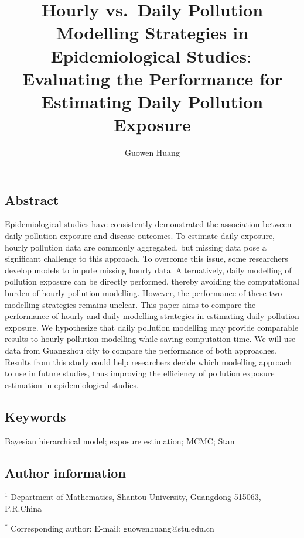 \documentclass[
  12,
]{article}
\title{Hourly vs.~Daily Pollution Modelling Strategies in
Epidemiological Studies\(:\) Evaluating the Performance for Estimating
Daily Pollution Exposure}
\author{Guowen Huang}
\begin{document}
\maketitle

\hypertarget{abstract}{%
\subsection*{Abstract}\label{abstract}}

Epidemiological studies have consistently demonstrated the association
between daily pollution exposure and disease outcomes. To estimate daily
exposure, hourly pollution data are commonly aggregated, but missing
data pose a significant challenge to this approach. To overcome this
issue, some researchers develop models to impute missing hourly data.
Alternatively, daily modelling of pollution exposure can be directly
performed, thereby avoiding the computational burden of hourly pollution
modelling. However, the performance of these two modelling strategies
remains unclear. This paper aims to compare the performance of hourly
and daily modelling strategies in estimating daily pollution exposure.
We hypothesize that daily pollution modelling may provide comparable
results to hourly pollution modelling while saving computation time. We
will use data from Guangzhou city to compare the performance of both
approaches. Results from this study could help researchers decide which
modelling approach to use in future studies, thus improving the
efficiency of pollution exposure estimation in epidemiological studies.

\hypertarget{keywords}{%
\subsection*{Keywords}\label{keywords}}

Bayesian hierarchical model; exposure estimation; MCMC; Stan

\hypertarget{author-information}{%
\subsection*{Author information}\label{author-information}}

\(^1\) Department of Mathematics, Shantou University, Guangdong 515063,
P.R.China

\(^*\) Corresponding author: E-mail: guowenhuang@stu.edu.cn
\end{document}
